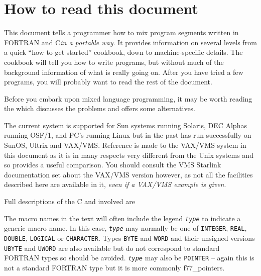 \documentclass[twoside,11pt,nolof]{starlink}
\begin{document}
\scfrontmatter

\section{\label{how_to}How to read this document}

This document tells a programmer how to mix program segments written in FORTRAN
and C\@ \textit{in a portable way}.
It provides information on several levels from a quick ``how to get
started'' cookbook, down to machine-specific details.
The cookbook will tell you how to
write programs, but without much of the background information of what is
really going on. After you have tried a few programs, you will probably want to
read the rest of the document.

Before you embark upon mixed language programming, it may be worth reading the
 which discusses the problems and
offers some alternatives.

The current system is supported for Sun systems running Solaris, DEC Alphas
running OSF/1, and PC's running Linux but in the past has run successfully on
SunOS, Ultrix and VAX/VMS.
Reference is made to the VAX/VMS system in this document as it is in
many respects very different from the Unix systems and so provides a useful
comparison. You should consult the VMS Starlink documentation set
about the VAX/VMS version however, as not all the facilities described here are
available in it, \textit{even if a VAX/VMS example is given}.

Full descriptions of the C
and
involved are


 The macro names in the text will often include the
legend \texttt{\textit{type}} to indicate a generic macro name. In this case,
\texttt{\textit{type}}\/ may normally be one of \texttt{INTEGER},
\texttt{REAL}, \texttt{DOUBLE}, \texttt{LOGICAL} or \texttt{CHARACTER}.
Types \texttt{BYTE} and \texttt{WORD} and their unsigned versions
\texttt{UBYTE} and \texttt{UWORD} are also available but do not correspond to
standard FORTRAN types so should be avoided.
\texttt{\textit{type}} may also be \texttt{POINTER} -- again this is not a
standard FORTRAN type but it is more commonly
{f77_pointers}.
\end{document}
